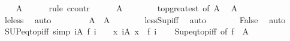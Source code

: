 \begin{isabellebody}
\ \ \isamarkupfalse%
\ {\isachardoublequoteopen}{\isasymSqunion}A\ {\isacharequal}{\kern0pt}\ {\isasymtop}{\isachardoublequoteclose}\isanewline
\ \ \isamarkupfalse%
\ {\isacharparenleft}{\kern0pt}rule\ ccontr{\isacharparenright}{\kern0pt}\isanewline
\ \ \ \ \isamarkupfalse%
\ {\isachardoublequoteopen}{\isasymSqunion}A\ {\isasymnoteq}\ {\isasymtop}{\isachardoublequoteclose}\isanewline
\ \ \ \ \isamarkupfalse%
\ top{\isacharunderscore}{\kern0pt}greatest\ {\isacharbrackleft}{\kern0pt}of\ {\isachardoublequoteopen}{\isasymSqunion}A{\isachardoublequoteclose}{\isacharbrackright}{\kern0pt}\ \isamarkupfalse%
\ {\isachardoublequoteopen}{\isasymSqunion}A\ {\isacharless}{\kern0pt}\ {\isasymtop}{\isachardoublequoteclose}\isanewline
\ \ \ \ \ \ \isamarkupfalse%
\ le{\isacharunderscore}{\kern0pt}less\ \isamarkupfalse%
\ auto\isanewline
\ \ \ \ \isamarkupfalse%
\ {\isacharasterisk}{\kern0pt}\ \isamarkupfalse%
\ {\isachardoublequoteopen}{\isasymSqunion}A\ {\isacharless}{\kern0pt}\ {\isasymSqunion}A{\isachardoublequoteclose}\isanewline
\ \ \ \ \ \ \isamarkupfalse%
\ less{\isacharunderscore}{\kern0pt}Sup{\isacharunderscore}{\kern0pt}iff\ \isamarkupfalse%
\ auto\isanewline
\ \ \ \ \isamarkupfalse%
\ \isamarkupfalse%
\ False\ \isamarkupfalse%
\ auto\isanewline
\ \ \isamarkupfalse%
\isanewline
{}\isamarkupfalse%
%
\endisatagproof
{\isafoldproof}%
%
\isadelimproof
\isanewline
%
\endisadelimproof
\isanewline
{}\isamarkupfalse%
\ SUP{\isacharunderscore}{\kern0pt}eq{\isacharunderscore}{\kern0pt}top{\isacharunderscore}{\kern0pt}iff\ {\isacharbrackleft}{\kern0pt}simp{\isacharbrackright}{\kern0pt}{\isacharcolon}{\kern0pt}\ {\isachardoublequoteopen}{\isacharparenleft}{\kern0pt}{\isasymSqunion}i{\isasymin}A{\isachardot}{\kern0pt}\ f\ i{\isacharparenright}{\kern0pt}\ {\isacharequal}{\kern0pt}\ {\isasymtop}\ {\isasymlongleftrightarrow}\ {\isacharparenleft}{\kern0pt}{\isasymforall}x{\isacharless}{\kern0pt}{\isasymtop}{\isachardot}{\kern0pt}\ {\isasymexists}i{\isasymin}A{\isachardot}{\kern0pt}\ x\ {\isacharless}{\kern0pt}\ f\ i{\isacharparenright}{\kern0pt}{\isachardoublequoteclose}\isanewline
%
\isadelimproof
\ \ %
\endisadelimproof
%
\isatagproof
{}\isamarkupfalse%
\ Sup{\isacharunderscore}{\kern0pt}eq{\isacharunderscore}{\kern0pt}top{\isacharunderscore}{\kern0pt}iff\ {\isacharbrackleft}{\kern0pt}of\ {\isachardoublequoteopen}f\ {\isacharbackquote}{\kern0pt}\ A{\isachardoublequoteclose}{\isacharbrackright}{\kern0pt}\ \isamarkupfalse%

\end{isabellebody}
